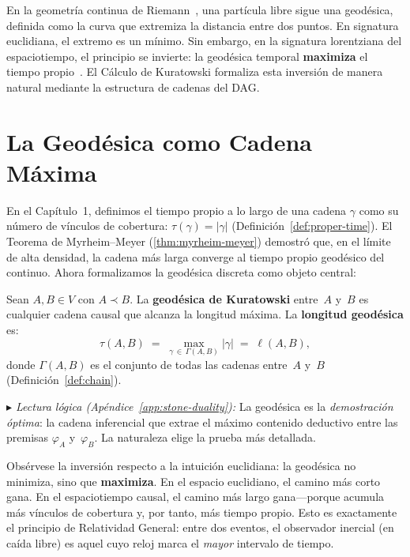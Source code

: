 \documentclass[11pt, a4paper, openany]{book}
\newcommand{\stoneref}[1]{%
  \smallskip\noindent
  {\small\color{structure!70}\textit{$\blacktriangleright$ Lectura
  l\'ogica (Ap\'endice~\ref{app:stone-duality}):} #1}%
  \smallskip}
\begin{document}
En la geometr\'ia continua de Riemann~\cite{wald1984}, una
part\'icula libre sigue una geod\'esica, definida como la curva que
extremiza la distancia entre dos puntos. En signatura euclidiana, el
extremo es un m\'inimo. Sin embargo, en la signatura lorentziana del
espaciotiempo, el principio se invierte: la geod\'esica temporal
\textbf{maximiza} el tiempo propio~\cite{mtw1973}. El C\'alculo de Kuratowski formaliza esta inversi\'on de
manera natural mediante la estructura de cadenas del DAG.

\section{La Geod\'esica como Cadena M\'axima}

En el Cap\'itulo~1, definimos el tiempo propio a lo largo de una
cadena $\gamma$ como su n\'umero de v\'inculos de cobertura:
$\tau(\gamma) = |\gamma|$
(Definici\'on~\ref{def:proper-time}). El Teorema de Myrheim--Meyer
(\ref{thm:myrheim-meyer}) demostr\'o que, en el l\'imite de alta
densidad, la cadena m\'as larga converge al tiempo propio
geod\'esico del continuo. Ahora formalizamos la geod\'esica discreta
como objeto central:

\begin{definition}
\label{def:geodesic}
Sean $A, B \in V$ con $A \prec B$. La \textbf{geod\'esica de
Kuratowski} entre~$A$ y~$B$ es cualquier cadena causal que alcanza
la longitud m\'axima. La \textbf{longitud geod\'esica} es:
\begin{equation}
  \boxed{\;
  \tau(A, B)
  \;=\;
  \max_{\gamma \,\in\, \Gamma(A,B)} |\gamma|
  \;=\; \ell(A,B),
  \;}
  \label{eq:geodesic-length}
\end{equation}
donde $\Gamma(A,B)$ es el conjunto de todas las cadenas entre~$A$
y~$B$ (Definici\'on~\ref{def:chain}).
\end{definition}

\stoneref{La geod\'esica es la \emph{demostraci\'on \'optima}: la
cadena inferencial que extrae el m\'aximo contenido deductivo entre
las premisas $\varphi_A$ y~$\varphi_B$. La naturaleza elige la
prueba m\'as detallada.}

\noindent
Obs\'ervese la inversi\'on respecto a la intuici\'on euclidiana: la
geod\'esica no minimiza, sino que \textbf{maximiza}. En el espacio
euclidiano, el camino m\'as corto gana. En el espaciotiempo causal,
el camino m\'as largo gana---porque acumula m\'as v\'inculos de
cobertura y, por tanto, m\'as tiempo propio. Esto es exactamente el
principio de Relatividad General: entre dos eventos, el observador
inercial (en ca\'ida libre) es aquel cuyo reloj marca el
\emph{mayor} intervalo de tiempo.
\end{document}
